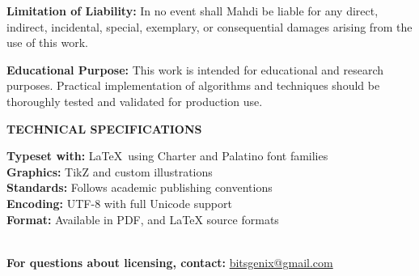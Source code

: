 \begin{flushleft}
{		\textbf{Limitation of Liability:} In no event shall Mahdi be liable for any direct, indirect, incidental, special, exemplary, or consequential damages arising from the use of this work.
		
		\textbf{Educational Purpose:} This work is intended for educational and research purposes. Practical implementation of algorithms and techniques should be thoroughly tested and validated for production use.
		
		\vspace{1.5em}
		
		\begin{center}
			\textbf{TECHNICAL SPECIFICATIONS}
		\end{center}
		
		\textbf{Typeset with:} \LaTeX\ using Charter and Palatino font families\\
		\textbf{Graphics:} TikZ and custom illustrations\\
		\textbf{Standards:} Follows academic publishing conventions\\
		\textbf{Encoding:} UTF-8 with full Unicode support\\
		\textbf{Format:} Available in PDF, and LaTeX source formats
	}
\end{flushleft}

\vfill

\begin{center}
	{\footnotesize
		\\[0.3em]
		\textbf{For questions about licensing, contact:} \url{bitsgenix@gmail.com}
	}
\end{center}

\clearpage